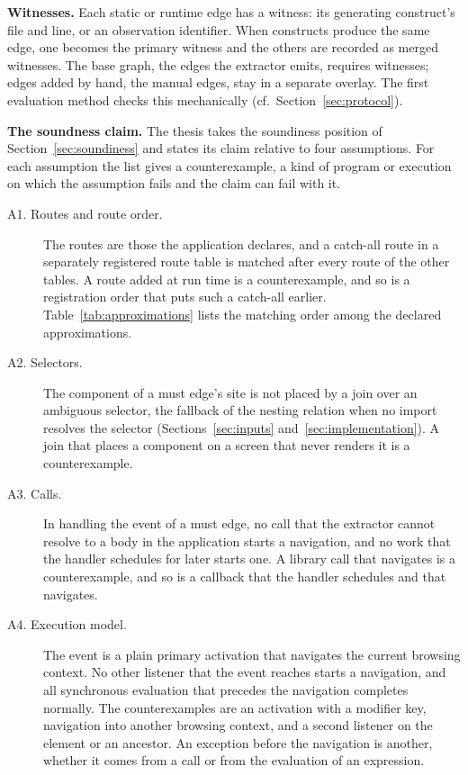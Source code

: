 \textbf{Witnesses.} Each static or runtime edge has a witness: its generating construct's file
and line, or an observation identifier. When constructs produce the same edge, one becomes
the primary witness and the others are recorded as merged witnesses.
The base graph, the edges the extractor emits, requires witnesses; edges added by hand, the manual edges, stay in a separate overlay. The first
evaluation method checks this mechanically (cf.~Section~\ref{sec:protocol}).

\textbf{The soundness claim.} The thesis takes the soundiness position of
Section~\ref{sec:soundiness} and states its claim relative to four assumptions. For each
assumption the list gives a counterexample, a kind of program or execution on which the assumption
fails and the claim can fail with it.
\begin{description}
\item[A1. Routes and route order.] The routes are those the application declares, and a
catch-all route in a separately registered route table is matched after every route of the
other tables. A route added at run time is a counterexample, and so is a registration order
that puts such a catch-all earlier. Table~\ref{tab:approximations} lists the matching order
among the declared approximations.
\item[A2. Selectors.] The component of a must edge's site is not placed by a join over an ambiguous selector,
the fallback of the nesting relation when no import resolves the selector
(Sections~\ref{sec:inputs} and~\ref{sec:implementation}). A join that places a component on a
screen that never renders it is a counterexample.
\item[A3. Calls.] In handling the event of a must edge, no call that the extractor cannot resolve to a body in the application starts a
navigation, and no work that the handler schedules for later starts one. A library call that
navigates is a counterexample, and so is a callback that the handler schedules and that
navigates.
\item[A4. Execution model.] The event is a plain primary activation that navigates the current
browsing context. No other listener that the event reaches starts a navigation, and all
synchronous evaluation that precedes the navigation completes normally. The counterexamples are
an activation with a modifier key, navigation into another browsing context, and a second listener on the element or an ancestor. An
exception before the navigation is another, whether it comes from a call or from the evaluation
of an expression.
\end{description}

